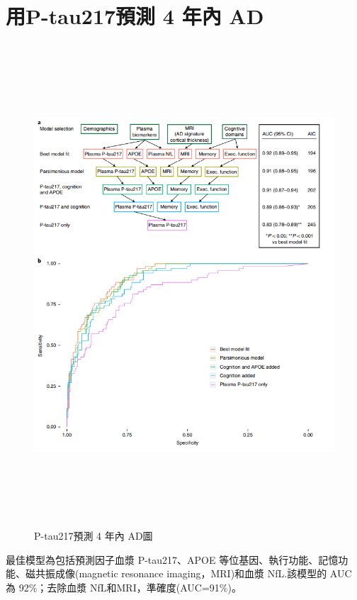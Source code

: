 \section{用P-tau217預測 4 年內 AD }
\begin{figure}[H]
	\centering
	\centerline{\includegraphics[height=18cm]{pic/AD217.PNG}}
	\caption{P-tau217預測 4 年內 AD圖}

	\label{fig:AD217}
\end{figure}
最佳模型為包括預測因子血漿 P-tau217、APOE 等位基因、執行功能、記憶功能、磁共振成像(magnetic resonance imaging，MRI)和血漿 NfL.該模型的 AUC 為 92\%；去除血漿 NfL和MRI，準確度(AUC=91\%)。


